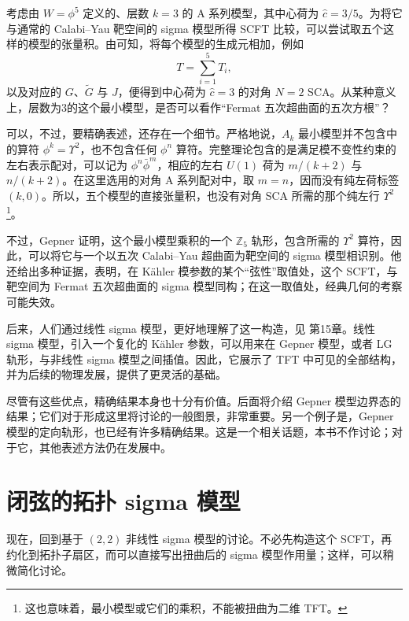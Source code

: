 考虑由 $W=\phi^5$ 定义的、层数 $k=3$ 的 A 系列模型，其中心荷为 $\widehat c=3/5$。为将它与通常的 Calabi--Yau 靶空间的 sigma 模型所得 SCFT 比较，可以尝试取五个这样的模型的张量积。由可知，将每个模型的生成元相加，例如
\[
T=\sum_{i=1}^5T_i,
\]
以及对应的 $G$、$\widetilde G$ 与 $J$，便得到中心荷为 $\widehat c=3$ 的对角 $N=2$ SCA。从某种意义上，层数为3的这个最小模型，是否可以看作“Fermat 五次超曲面的五次方根”？

可以，不过，要精确表述，还存在一个细节。严格地说，$A_k$ 最小模型并不包含中的算符 $\phi^k=\Upsilon^2$，也不包含任何 $\phi^n$ 算符。完整理论包含的是满足模不变性约束的左右表示配对，可以记为 $\phi^n\bar\phi^m$，相应的左右 $U(1)$ 荷为 $m/(k+2)$ 与 $n/(k+2)$。在这里选用的对角 A 系列配对中，取 $m=n$，因而没有纯左荷标签 $(k,0)$。所以，五个模型的直接张量积，也没有对角 SCA 所需的那个纯左行 $\Upsilon^2$\footnote{这也意味着，最小模型或它们的乘积，不能被扭曲为二维 TFT。}。

不过，Gepner 证明，这个最小模型乘积的一个 $\mathbb{Z}_5$ 轨形，包含所需的 $\Upsilon^2$ 算符，因此，可以将它与一个以五次 Calabi--Yau 超曲面为靶空间的 sigma 模型相识别。他还给出多种证据，表明，在 K\"ahler 模参数的某个“弦性”取值处，这个 SCFT，与靶空间为 Fermat 五次超曲面的 sigma 模型同构；在这一取值处，经典几何的考察可能失效。

后来，人们通过线性 sigma 模型，更好地理解了这一构造，见  第15章。线性 sigma 模型，引入一个复化的 K\"ahler 参数，可以用来在 Gepner 模型，或者 LG 轨形，与非线性 sigma 模型之间插值。因此，它展示了 TFT 中可见的全部结构，并为后续的物理发展，提供了更灵活的基础。

尽管有这些优点，精确结果本身也十分有价值。后面将介绍 Gepner 模型边界态的结果；它们对于形成这里将讨论的一般图景，非常重要。另一个例子是，Gepner 模型的定向轨形，也已经有许多精确结果。这是一个相关话题，本书不作讨论；对于它，其他表述方法仍在发展中。

\section{闭弦的拓扑 sigma 模型}\label{sec:3.4}

现在，回到基于 $(2,2)$ 非线性 sigma 模型的讨论。不必先构造这个 SCFT，再约化到拓扑子扇区，而可以直接写出扭曲后的 sigma 模型作用量；这样，可以稍微简化讨论。

